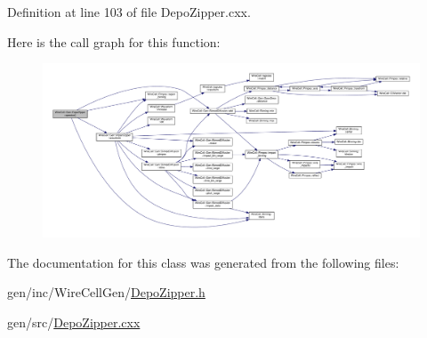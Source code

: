 Definition at line 103 of file Depo\+Zipper.\+cxx.

Here is the call graph for this function\+:
\nopagebreak
\begin{figure}[H]
\begin{center}
\leavevmode
\includegraphics[width=350pt]{class_wire_cell_1_1_gen_1_1_depo_zipper_af883a6a654a4a374d17f4db84d268510_cgraph}
\end{center}
\end{figure}


The documentation for this class was generated from the following files\+:\begin{DoxyCompactItemize}
\item 
gen/inc/\+Wire\+Cell\+Gen/\hyperlink{_depo_zipper_8h}{Depo\+Zipper.\+h}\item 
gen/src/\hyperlink{_depo_zipper_8cxx}{Depo\+Zipper.\+cxx}\end{DoxyCompactItemize}
